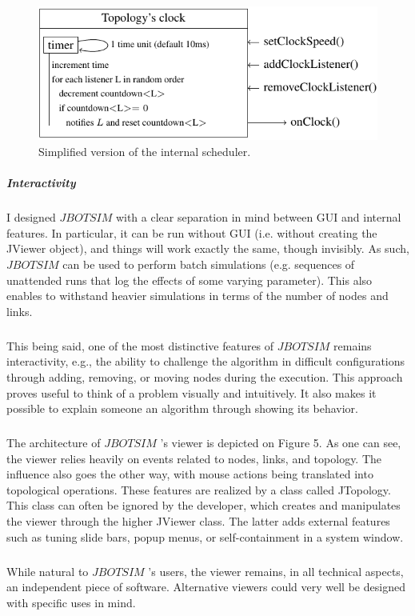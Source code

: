 \begin{figure}[h!]
	\centering
	\includegraphics[width=.7\linewidth]{fig_5}
	\caption[Simplified version of the internal scheduler.]{Simplified version of the internal scheduler.}
	\label{fig:fig5}
\end{figure}
\subparagraph{Interactivity}I designed $JBOTSIM$ with a clear separation in mind between GUI and internal features. In particular, it can be run without GUI (i.e. without creating the JViewer object), and things will work exactly the same, though invisibly. As such, $JBOTSIM$ can be used to perform batch simulations (e.g. sequences of unattended runs that log the effects of some varying parameter). This also enables to withstand heavier simulations in terms of the number of nodes and links.
\subparagraph{}This being said, one of the most distinctive features of $JBOTSIM$ remains interactivity, e.g., the ability to challenge the algorithm in difficult configurations through adding, removing, or moving nodes during the execution. This approach proves useful to think of a problem visually and intuitively. It also makes it possible to explain someone an algorithm through showing its behavior.
\subparagraph{}The architecture of  $JBOTSIM$ ’s viewer is depicted on Figure 5. As one can see, the viewer relies heavily on events related to nodes, links, and topology. The influence also goes the other way, with mouse actions being translated into topological operations. These features are realized by a class called JTopology. This class can often be ignored by the developer, which creates and manipulates the viewer through the higher JViewer class. The latter adds external features such as tuning slide bars, popup menus, or self-containment in a system window. 
\subparagraph{}While natural to  $JBOTSIM$ ’s users, the viewer remains, in all technical aspects, an independent piece of software. Alternative viewers could very well be designed with specific uses in mind.


